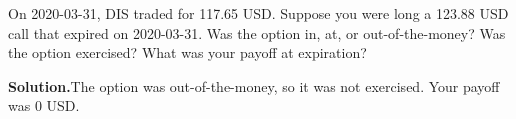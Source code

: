 \noindent On 2020-03-31, DIS traded for 117.65 USD. Suppose you were long a 123.88 USD call that expired on 2020-03-31. Was the option in, at, or out-of-the-money? Was the option exercised? What was your payoff at expiration?

\vspace{9pt} 

\textbf{Solution.}The option was out-of-the-money, so it was not exercised. Your payoff was 0 USD.